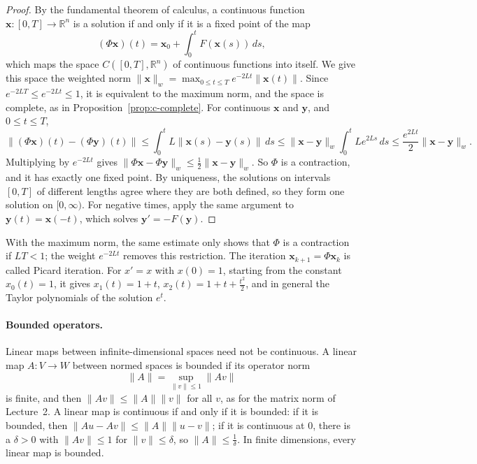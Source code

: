 \documentclass[11pt]{article}
\newcommand{\norm}[1]{\lVert #1 \rVert}
\theoremstyle{definition}
\theoremstyle{plain}
\theoremstyle{remark}
\begin{document}
\begin{proof}
    By the fundamental theorem of calculus, a continuous function $\mathbf{x}: [0, T] \to \mathbb{R}^n$ is a solution if and only if it is a fixed point of the map
    \[(\Phi\mathbf{x})(t) = \mathbf{x}_0 + \int_0^t F(\mathbf{x}(s))\, ds,\]
    which maps the space $C([0, T], \mathbb{R}^n)$ of continuous functions into itself. We give this space the weighted norm $\norm{\mathbf{x}}_w = \max_{0 \leq t \leq T} e^{-2Lt}\norm{\mathbf{x}(t)}$. Since $e^{-2LT} \leq e^{-2Lt} \leq 1$, it is equivalent to the maximum norm, and the space is complete, as in Proposition~\ref{prop:c-complete}. For continuous $\mathbf{x}$ and $\mathbf{y}$, and $0 \leq t \leq T$,
    \[\norm{(\Phi\mathbf{x})(t) - (\Phi\mathbf{y})(t)} \leq \int_0^t L\norm{\mathbf{x}(s) - \mathbf{y}(s)}\, ds \leq \norm{\mathbf{x} - \mathbf{y}}_w\int_0^t Le^{2Ls}\, ds \leq \frac{e^{2Lt}}{2}\norm{\mathbf{x} - \mathbf{y}}_w.\]
    Multiplying by $e^{-2Lt}$ gives $\norm{\Phi\mathbf{x} - \Phi\mathbf{y}}_w \leq \frac{1}{2}\norm{\mathbf{x} - \mathbf{y}}_w$. So $\Phi$ is a contraction, and it has exactly one fixed point. By uniqueness, the solutions on intervals $[0, T]$ of different lengths agree where they are both defined, so they form one solution on $[0, \infty)$. For negative times, apply the same argument to $\mathbf{y}(t) = \mathbf{x}(-t)$, which solves $\mathbf{y}' = -F(\mathbf{y})$.
\end{proof}

With the maximum norm, the same estimate only shows that $\Phi$ is a contraction if $LT < 1$; the weight $e^{-2Lt}$ removes this restriction. The iteration $\mathbf{x}_{k+1} = \Phi\mathbf{x}_k$ is called Picard iteration. For $x' = x$ with $x(0) = 1$, starting from the constant $x_0(t) = 1$, it gives $x_1(t) = 1 + t$, $x_2(t) = 1 + t + \frac{t^2}{2}$, and in general the Taylor polynomials of the solution $e^t$.

\paragraph{Bounded operators.} Linear maps between infinite-dimensional spaces need not be continuous. A linear map $A: V \to W$ between normed spaces is bounded if its operator norm
\[\norm{A} = \sup_{\norm{v} \leq 1}\norm{Av}\]
is finite, and then $\norm{Av} \leq \norm{A}\norm{v}$ for all $v$, as for the matrix norm of Lecture~2. A linear map is continuous if and only if it is bounded: if it is bounded, then $\norm{Au - Av} \leq \norm{A}\norm{u - v}$; if it is continuous at $0$, there is a $\delta > 0$ with $\norm{Av} \leq 1$ for $\norm{v} \leq \delta$, so $\norm{A} \leq \frac{1}{\delta}$. In finite dimensions, every linear map is bounded.
\end{document}
